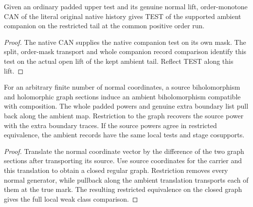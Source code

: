 \begin{theorem}
\label{hir:g1-normal-order-companion-native-can}
\leanok
Given an ordinary padded upper test and its genuine normal lift,
order-monotone CAN of the literal original native history gives
TEST of the supported ambient companion on the restricted tail at
the common positive order run.
\end{theorem}
\begin{proof}
The native CAN supplies the native companion test on its own mask.
The split, order-mask transport and whole companion record comparison
identify this test on the actual open lift of the kept ambient tail.
Reflect TEST along this lift.
\end{proof}

\begin{theorem}
\label{hir:g1-normal-graph-finite-block}
\leanok
For an arbitrary finite number of normal coordinates, a source
biholomorphism and holomorphic graph sections induce an ambient
biholomorphism compatible with composition. The whole padded powers
and genuine extra boundary list pull back along the ambient map.
Restriction to the graph recovers the source power with the extra
boundary traces. If the source powers agree in restricted equivalence,
the ambient records have the same local tests and stage cosupports.
\end{theorem}
\begin{proof}
Translate the normal coordinate vector by the difference of the
two graph sections after transporting its source. Use source
coordinates for the carrier and this translation to obtain a
closed regular graph. Restriction removes every normal generator,
while pullback along the ambient translation transports each of them
at the true mark. The resulting restricted equivalence on the closed
graph gives the full local weak class comparison.
\end{proof}

